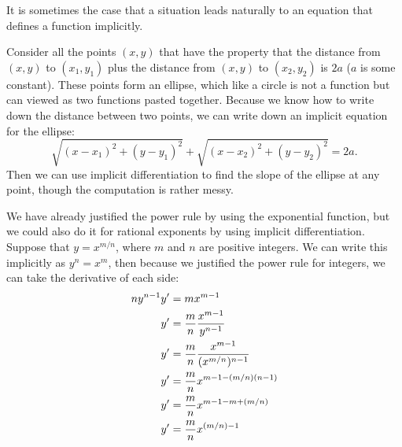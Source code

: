 It is sometimes the case that a situation leads naturally to an
equation that defines a function implicitly. 

\begin{example} Consider all the points $(x,y)$ that have the property that 
the distance from $(x,y)$ to $(x_1,y_1)$ plus the distance 
from $(x,y)$ to $(x_2,y_2)$ is $2a$ ($a$ is some constant). These
points form an ellipse, which like a circle is not a function but can
viewed as two functions pasted together. Because we know how to write
down the distance between two points, we can write down an implicit
equation for the ellipse:
$$\sqrt{(x-x_1)^2+(y-y_1)^2}+\sqrt{(x-x_2)^2+(y-y_2)^2}=2a.$$
Then we can use implicit differentiation to find the slope of the
ellipse at any point, though the computation is rather messy.
\label{example:ellipse}
\end{example}

\begin{example} We have already justified the power rule by
using the exponential function, but we could also do it for rational
exponents by using implicit differentiation.  Suppose that
$y=x^{m/n}$, where $m$ and $n$ are positive integers. We can write
this implicitly as $y^n=x^m$, then because we justified the power rule
for integers, we can take the derivative of each side:
\begin{align*}
ny^{n-1}y' &= mx^{m-1} \\
y'&= {m\over n}{x^{m-1}\over y^{n-1}} \\
y'&= {m\over n}{x^{m-1}\over (x^{m/n})^{n-1}} \\
y'&= {m\over n}x^{m-1-(m/n)(n-1)} \\
y'&= {m\over n}x^{m-1-m+(m/n)} \\
y'&= {m\over n}x^{(m/n)-1} \\
\end{align*}
\end{example}

